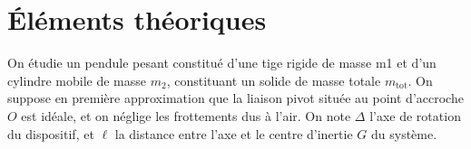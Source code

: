 \documentclass[a4paper,french,bookmarks]{article}
\begin{document}


\section{Éléments théoriques}

On étudie un pendule pesant constitué d'une tige rigide de masse m1 et d'un cylindre mobile de masse $m_2$, constituant un solide de masse totale $m_\text{tot}$. On suppose en première approximation que la liaison pivot située au point d'accroche $O$ est idéale, et on néglige les frottements dus à l'air. On note $\Delta$ l'axe de rotation du dispositif, et $\ell$ la distance entre l'axe et le centre d'inertie $G$ du système.
\end{document}
